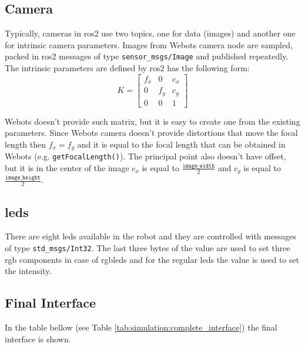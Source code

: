 \subsection{Camera}
Typically, cameras in \ac{ros2} use two topics, one for data (images) and another one for intrinsic camera parameters. Images from Webots camera node are sampled, packed in \ac{ros2} messages of type \texttt{sensor\_msgs/Image} and published repeatedly. The intrinsic parameters are defined by \ac{ros2} has the following form:
\begin{equation}
K = \begin{bmatrix}
    f_x & 0 & c_x \\
    0 & f_y & c_y \\
    0 & 0 & 1
\end{bmatrix}
\end{equation}

Webots doesn't provide such matrix, but it is easy to create one from the existing parameters. Since Webots camera doesn't provide distortions that move the focal length then $f_x = f_y$ and it is equal to the focal length that can be obtained in Webots (e.g. \texttt{getFocalLength()}). The principal point also doesn't have offset, but it is in the center of the image $c_x$ is equal to $ \frac{\texttt{image\_width}}{2} $ and $c_y$ is equal to $ \frac{\texttt{image\_height}}{2} $.

\subsection{\acsp{led}}
There are eight \acsp{led} available in the robot and they are controlled with messages of type \texttt{std\_msgs/Int32}. The last three bytes of the value are used to set three \ac{rgb} components in case of \acsp{rgbled} and for the regular \acp{led} the value is used to set the intensity.

\subsection{Final Interface}

In the table bellow (see Table \ref{tab:simulation:complete_interface}) the final interface is shown.

